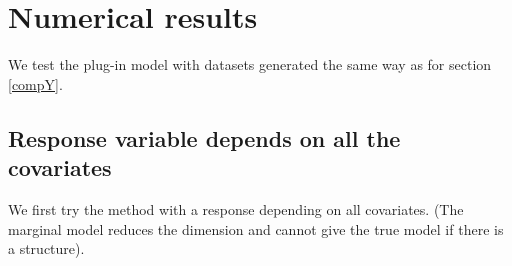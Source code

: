 \documentclass[12pt,a4paper]{report}
\begin{document}
%		
%		
%
				
		
		
	\section{Numerical results} \label{resnumpred}
		We test the plug-in model with datasets generated the same way as for section \ref{compY}.		
\subsection{Response variable depends on all the covariates}	
We first try the method with a response depending on all covariates. (The marginal model reduces the dimension and cannot give the true model if there is a structure).
\end{document}
